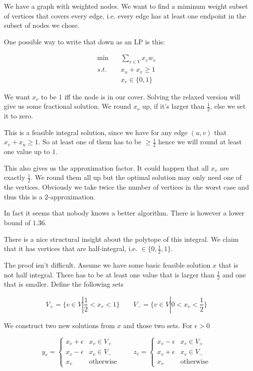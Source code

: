 \begin{Ex} We have a graph with weighted nodes. We want to find a miminum weight subset of vertices that covers every edge, i.e. every edge has at least one endpoint in the subset of nodes we chose.

One possible way to write that down as an LP is this:

\begin{align*}
\min \quad & \sum_{v\in V} x_v w_v\\
s.t. \quad & x_u+x_v \geq 1\\
	& x_v\in \{0,1\}
\end{align*}

We want $x_v$ to be $1$ iff the node is in our cover. Solving the relaxed version will give us some fractional solution. We round $x_v$ up, if it's larger than $\frac 12$, else we set it to zero.

This is a feasible integral solution, since we have for any edge $(u,v)$ that $x_v+x_u\geq 1$. So at least one of them has to be $\geq \frac 12$ hence we will round at least one value up to $1$.

This also gives us the approximation factor. It could happen that all $x_v$ are exactly $\frac 12$. We round them all up but the optimal solution may only need one of the vertices. Obviously we take twice the number of vertices in the worst case and thus this is a $2$-approximation.

In fact it seems that nobody knows a better algorithm. There is however a lower bound of $1.36$.

There is a nice structural insight about the polytope of this integral. We claim that it has vertices that are half-integral, i.e. $\in \{0,\frac 12,1\}$.

The proof isn't difficult. Assume we have some basic feasible solution $x$ that is not half integral. There has to be at least one value that is larger than $\frac 12$ and one that is smaller. Define the following sets

\[V_+ = \{v \in V | \frac 12 < x_v < 1\} \qquad V_- = \{v\in V |0 < x_v < \frac 12\}\]

We construct two new solutions from $x$ and those two sets. For $\epsilon > 0$

\[y_v = \begin{cases}
x_v + \epsilon & x_v \in V_+\\
x_v - \epsilon & x_v \in V_-\\
x_v & \text{otherwise}\end{cases} \qquad z_v = \begin{cases}
x_v - \epsilon & x_v \in V_+\\
x_v + \epsilon & x_v \in V_-\\
x_v & \text{otherwise}\end{cases}\]


\end{Ex}
